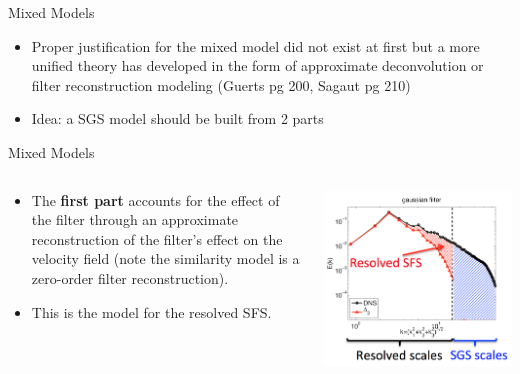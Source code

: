 \begin{frame}{Mixed Models}
\begin{itemize}
	\item Proper justification for the mixed model did not exist at first but a more unified theory has developed in the form of approximate deconvolution or filter reconstruction modeling (Guerts pg 200, Sagaut pg 210)
	\item Idea: a SGS model should be built from 2 parts
\end{itemize}

\end{frame}

\begin{frame}{Mixed Models}
\begin{columns}[T]
    \begin{column}{.55\textwidth}
    \begin{minipage}[c][.6\textheight][c]{\linewidth}
    \begin{itemize}
	\item The \textbf{first part} accounts for the effect of the filter through an approximate reconstruction of the filter’s effect on the velocity field (note the similarity model is a zero-order filter reconstruction). 
	\item This is the model for the resolved SFS.
\end{itemize}
      \end{minipage}
    \end{column}
    \begin{column}{.55\textwidth}
      \includegraphics[width=\textwidth]{sfs}
    \end{column}
  \end{columns}
\end{frame}

